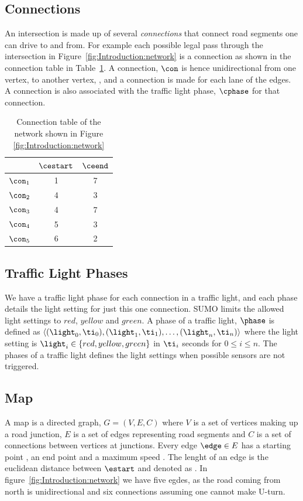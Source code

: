\subsection{Connections}
An intersection is made up of several \textit{connections} that connect road segments one can drive to and from.
For example each possible legal pass through the intersection in Figure~\ref{fig:Introduction:network} is a connection as shown in the connection table in Table~\ref{tab:Introduction:connectionTable}. 
A connection, $\con$ is hence unidirectional from one vertex, \cestart to another vertex, \ceend, and a connection is made for each lane of the edges.
A connection is also associated with the traffic light phase, $\cphase$ for that connection.
\begin{table}[h]
\centering
\begin{tabular}{|l|c|c|}
\hline
&$\cestart$ & $\ceend$ \\ \hline
$\con_1$ & 1 & 7 \\ \hline
$\con_2$ & 4 & 3 \\ \hline
$\con_3$ & 4 & 7 \\ \hline
$\con_4$ & 5 & 3 \\ \hline
$\con_5$ & 6 & 2 \\ \hline
\end{tabular}
\caption{Connection table of the network shown in Figure \ref{fig:Introduction:network} }
\label{tab:Introduction:connectionTable}
\end{table}

\subsection{Traffic Light Phases}
We have a traffic light phase for each connection in a traffic light, and each phase details the light setting for just this one connection.
SUMO limits the allowed light settings to $red$, $yellow$ and $green$.
A phase of a traffic light, $\phase$ is defined as $\langle(\light_0, \ti_0),(\light_1, \ti_1),\dots, (\light_n, \ti_n) \rangle$ where the light setting is $\light_i\in \{red, yellow, green\}$ in $\ti_i$ seconds for $0 \leq i \leq n$.
The phases of a traffic light defines the light settings when possible sensors are not triggered.


\subsection{Map}
A map is a directed graph, $G = (V, E, C)$ where $V$ is a set of vertices making up a road junction, $E$ is a set of edges representing road segments and $C$ is a set of connections between vertices at junctions.
Every edge $\edge\in E$ has a starting point \estart, an end point \eend and a maximum speed \espeed. 
The lenght of an edge is the euclidean distance between $\estart$ and \eend denoted as \elength.
In figure~\ref{fig:Introduction:network} we have five egdes, as the road coming from north is unidirectional and six connections assuming one cannot make U-turn.

